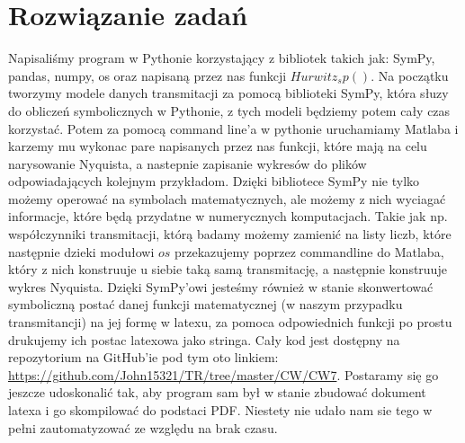 \documentclass{article}
\begin{document}
\section{Rozwiązanie zadań}

Napisaliśmy program w Pythonie korzystający z bibliotek takich jak: SymPy, pandas, numpy, 
os oraz napisaną przez nas funkcji $Hurwitz_sp()$. Na początku tworzymy modele danych 
transmitacji za pomocą biblioteki SymPy, która słuzy do obliczeń symbolicznych w 
Pythonie, z tych modeli będziemy potem cały czas korzystać. Potem za pomocą command 
line'a w pythonie uruchamiamy Matlaba i karzemy mu wykonac pare napisanych przez nas 
funkcji, które mają na celu narysowanie Nyquista, a nastepnie zapisanie wykresów do 
plików odpowiadających kolejnym przykładom.
Dzięki bibliotece SymPy nie tylko możemy operować na symbolach matematycznych, ale możemy z nich wyciagać informacje, które będą przydatne w numerycznych komputacjach. Takie jak np. współczynniki transmitacji, którą badamy możemy zamienić na listy liczb, które następnie dzieki modułowi $os$ przekazujemy poprzez commandline do Matlaba, który z nich konstruuje u siebie taką samą transmitację, a następnie konstruuje wykres Nyquista. Dzięki SymPy'owi jesteśmy również w stanie skonwertować symboliczną postać danej funkcji matematycznej (w naszym przypadku transmitancji) na jej formę w latexu, za pomoca odpowiednich funkcji po prostu drukujemy ich postac latexowa jako stringa.
Cały kod jest dostępny na repozytorium na GitHub'ie pod tym oto linkiem: \url{https://github.com/John15321/TR/tree/master/CW/CW7}. Postaramy się go jeszcze udoskonalić tak, aby program sam był w stanie zbudować dokument latexa i go skompilować do podstaci PDF. Niestety nie udało nam sie tego w pełni zautomatyzować ze względu na brak czasu.
\end{document}
